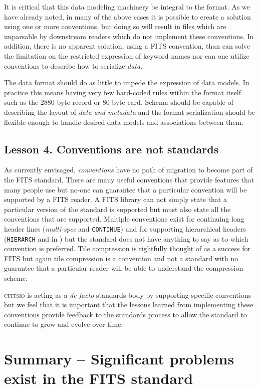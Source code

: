 \documentclass[final,authoryear,5p,times,twocolumn]{elsarticle}
\begin{document}
{{It is critical that this data modeling machinery be integral to the format.
As we have already noted, in many of the above cases it is possible to 
create a solution using one or more conventions, but doing so will
result in files which are unparsable by downstream readers which
do not implement these conventions. In addition, there is no apparent 
solution, using a FITS convention, than can solve the limitation on the
restricted expression of keyword names nor can one utilize conventions
to describe how to serialize \textit{data}.


The data format should do as little to impede the expression of data 
models.  In practice this means having very few hard-coded rules
within the format itself such as the 2880 byte record or 80 byte card.
Schema should be capable of describing the layout of \textit{data and metadata}
 and the format serialization should be flexible enough to handle 
desired data models and associations between them.


\subsection{Lesson 4. Conventions are not standards}
As currently envisaged, \emph{conventions} have no path of migration
to become part of the FITS standard. There are many useful conventions
that provide features that many people use but no-one can guarantee
that a particular convention will be supported by a FITS reader. A
FITS library can not simply state that a particular version of the
standard is supported but must also state all the conventions that are
supported. Multiple conventions exist for
continuing long header lines (\emph{multi-spec} and \texttt{CONTINUE})
and for supporting hierarchical headers (\texttt{HIERARCH} and in 
\citealt{FITSDistort}) but the standard does not have anything to say
as to which convention is preferred. Tile compression is rightfully
thought of as a success for FITS but again tile compression is a
convention and not a standard with no guarantee that a particular
reader will be able to understand the compression scheme.

\textsc{cfitsio} is acting as a \emph{de facto} standards body by
supporting specific conventions but we feel that it is important that
the lessons learned from implementing these conventions provide
feedback to the standards process to allow the standard to continue to
grow and evolve over time.

\section{Summary -- Significant problems exist in the FITS standard}


}}
\end{document}
